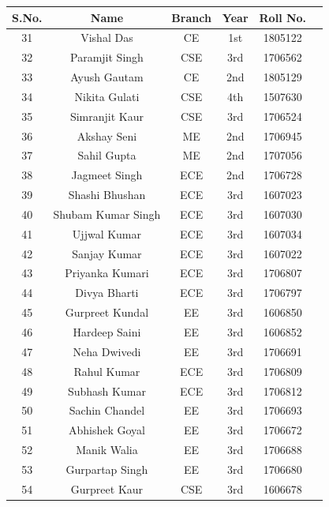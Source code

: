 \documentclass[12pt, a4 paper]{article}
\begin{document}
\begin{table}[h!]
  \begin{center}
    \begin{tabular}{|c|c|c|c|c|c|} 
    \toprule %
      \textbf{S.No.} & \textbf{Name} & \textbf{Branch} & \textbf{Year} &\textbf{Roll No.} \\
\midrule %
31      &Vishal Das     &CE     &1st    &1805122\\
32      &Paramjit Singh &CSE    &3rd    &1706562\\
33      &Ayush Gautam   &CE     &2nd    &1805129\\
34      &Nikita Gulati  &CSE    &4th    &1507630\\
35      &Simranjit Kaur &CSE    &3rd    &1706524\\
36      &Akshay Seni    &ME     &2nd    &1706945\\
37      &Sahil Gupta    &ME     &2nd    &1707056\\
38      &Jagmeet Singh  &ECE    &2nd    &1706728\\
39      &Shashi Bhushan &ECE    &3rd    &1607023\\
40      &Shubam Kumar Singh     &ECE    &3rd    &1607030\\
41      &Ujjwal Kumar   &ECE    &3rd    &1607034\\
42      &Sanjay Kumar   &ECE    &3rd    &1607022\\
43      &Priyanka Kumari        &ECE    &3rd    &1706807\\
44      &Divya Bharti   &ECE    &3rd    &1706797\\
45      &Gurpreet Kundal        &EE     &3rd    &1606850\\
46      &Hardeep Saini  &EE     &3rd    &1606852\\
47      &Neha Dwivedi   &EE     &3rd    &1706691\\
48      &Rahul Kumar    &ECE    &3rd    &1706809\\
49      &Subhash Kumar  &ECE    &3rd    &1706812\\
50      &Sachin Chandel &EE     &3rd    &1706693\\
51      &Abhishek Goyal &EE     &3rd    &1706672\\
52      &Manik Walia    &EE     &3rd    &1706688\\
53      &Gurpartap Singh        &EE     &3rd    &1706680\\
54      &Gurpreet Kaur  &CSE    &3rd    &1606678\\

\end{tabular}
\end{center}
\end{table}
\end{document}
